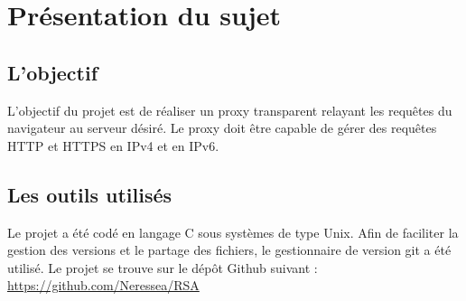 \section{Présentation du sujet} %

\subsection{L'objectif}

L'objectif du projet est de réaliser un proxy transparent relayant les requêtes du navigateur au serveur désiré. 
Le proxy doit être capable de gérer des requêtes HTTP et HTTPS en IPv4 et en IPv6.

\subsection{Les outils utilisés}

Le projet a été codé en langage C sous systèmes de type Unix. Afin de faciliter la gestion des versions et le partage des fichiers, le gestionnaire de version git a été utilisé. Le projet se trouve sur le dépôt Github suivant : \url{https://github.com/Neressea/RSA}
